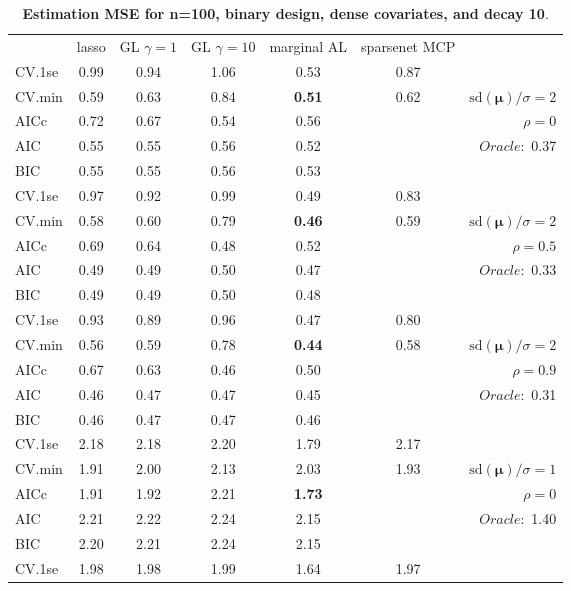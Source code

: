 \clearpage
\begin{table}\vspace{-.5cm}
\caption[l]{ { \bf Estimation MSE for n=100, binary design, 
dense covariates, and  decay  10}.}
\vspace{-.5cm}
\footnotesize{}
\begin{center}
\begin{tabular}{l*{5}{c}|r}
& lasso & GL $\gamma=1$ & GL $\gamma=10$ & marginal AL & sparsenet MCP  & \\
 \cline{1-7}
CV.1se & 0.99 & 0.94 & 1.06 & 0.53 & 0.87 & \\
CV.min & 0.59 & 0.63 & 0.84 & {\bf 0.51} & 0.62 &  $\mathrm{sd}(\mathbf{\mu})/\sigma=2$ \\
AICc & 0.72 & 0.67 & 0.54 & 0.56 & & $\rho=0$ \\
AIC & 0.55 & 0.55 & 0.56 & 0.52 & &  \multirow{2}{*}{$Oracle: $ 0.37} \\
BIC & 0.55 & 0.55 & 0.56 & 0.53 & &  \\
 \hline 
CV.1se & 0.97 & 0.92 & 0.99 & 0.49 & 0.83 & \\
CV.min & 0.58 & 0.60 & 0.79 & {\bf 0.46} & 0.59 &  $\mathrm{sd}(\mathbf{\mu})/\sigma=2$ \\
AICc & 0.69 & 0.64 & 0.48 & 0.52 & & $\rho=0.5$ \\
AIC & 0.49 & 0.49 & 0.50 & 0.47 & &  \multirow{2}{*}{$Oracle: $ 0.33} \\
BIC & 0.49 & 0.49 & 0.50 & 0.48 & &  \\
 \hline 
CV.1se & 0.93 & 0.89 & 0.96 & 0.47 & 0.80 & \\
CV.min & 0.56 & 0.59 & 0.78 & {\bf 0.44} & 0.58 &  $\mathrm{sd}(\mathbf{\mu})/\sigma=2$ \\
AICc & 0.67 & 0.63 & 0.46 & 0.50 & & $\rho=0.9$ \\
AIC & 0.46 & 0.47 & 0.47 & 0.45 & &  \multirow{2}{*}{$Oracle: $ 0.31} \\
BIC & 0.46 & 0.47 & 0.47 & 0.46 & &  \\
 \hline 
CV.1se & 2.18 & 2.18 & 2.20 & 1.79 & 2.17 & \\
CV.min & 1.91 & 2.00 & 2.13 & 2.03 & 1.93 &  $\mathrm{sd}(\mathbf{\mu})/\sigma=1$ \\
AICc & 1.91 & 1.92 & 2.21 & {\bf 1.73} & & $\rho=0$ \\
AIC & 2.21 & 2.22 & 2.24 & 2.15 & &  \multirow{2}{*}{$Oracle: $ 1.40} \\
BIC & 2.20 & 2.21 & 2.24 & 2.15 & &  \\
 \hline 
CV.1se & 1.98 & 1.98 & 1.99 & 1.64 & 1.97 & \\

\end{tabular}
\end{center}
\end{table}
